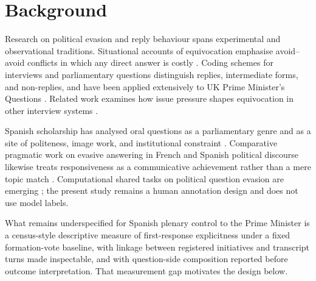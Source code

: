 \section{Background}
\label{sec:background}

Research on political evasion and reply behaviour spans experimental and
observational traditions. Situational accounts of equivocation emphasise
avoid--avoid conflicts in which any direct answer is costly
\citep{bavelas_etal_1988}. Coding schemes for interviews and parliamentary
questions distinguish replies, intermediate forms, and non-replies, and have
been applied extensively to UK Prime Minister's Questions
\citep{bull_mayer_1993,bull_1994_identifying,bull_strawson_2020,bull_waddle_2019_jlac,bull_waddle_2023_jspp}.
Related work examines how issue pressure shapes equivocation in other
interview systems \citep{feldman_kinoshita_bull_2016}.

Spanish scholarship has analysed oral questions as a parliamentary genre and
as a site of politeness, image work, and institutional constraint
\citep{fuentes_2011_clr,fuentes_2012_ph,santos_lopez_2010_iberica}. Comparative
pragmatic work on evasive answering in French and Spanish political discourse
likewise treats responsiveness as a communicative achievement rather than a
mere topic match \citep{sanchez_villanueva_2022_thesis}. Computational shared
tasks on political question evasion are emerging
\citep{thomas_etal_2026_semeval}; the present study remains a human annotation
design and does not use model labels.

What remains underspecified for Spanish plenary control to the Prime Minister
is a census-style descriptive measure of first-response explicitness under a
fixed formation-vote baseline, with linkage between registered initiatives and
transcript turns made inspectable, and with question-side composition reported
before outcome interpretation. That measurement gap motivates the design below.
